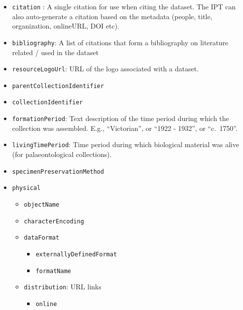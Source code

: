 \documentclass[
  letterpaper,
  DIV=11,
  numbers=noendperiod,
  oneside]{scrreprt}
\providecommand{\tightlist}{%
  \setlength{\itemsep}{0pt}\setlength{\parskip}{0pt}}\usepackage{longtable,booktabs,array}
\begin{document}
\begin{itemize}
\begin{itemize}
\begin{itemize}
      \begin{itemize}
      \tightlist
      \item
        \texttt{citation} : A single citation for use when citing the
        dataset. The IPT can also auto-generate a citation based on the
        metadata (people, title, organization, onlineURL, DOI etc).
      \item
        \texttt{bibliography}: A list of citations that form a
        bibliography on literature related / used in the dataset
      \item
        \texttt{resourceLogoUrl}: URL of the logo associated with a
        dataset.
      \item
        \texttt{parentCollectionIdentifier}
      \item
        \texttt{collectionIdentifier}
      \item
        \texttt{formationPeriod}: Text description of the time period
        during which the collection was assembled. E.g., ``Victorian'',
        or ``1922 - 1932'', or ``c.~1750''.
      \item
        \texttt{livingTimePeriod}: Time period during which biological
        material was alive (for palaeontological collections).
      \item
        \texttt{specimenPreservationMethod}
      \item
        \texttt{physical}

        \begin{itemize}
        \tightlist
        \item
          \texttt{objectName}
        \item
          \texttt{characterEncoding}
        \item
          \texttt{dataFormat}

          \begin{itemize}
          \tightlist
          \item
            \texttt{externallyDefinedFormat}
          \item
            \texttt{formatName}
          \end{itemize}
        \item
          \texttt{distribution}: URL links

          \begin{itemize}
          \tightlist
          \item
            \texttt{online}


\end{itemize}
\end{itemize}
\end{itemize}
\end{itemize}
\end{itemize}
\end{itemize}
\end{document}
